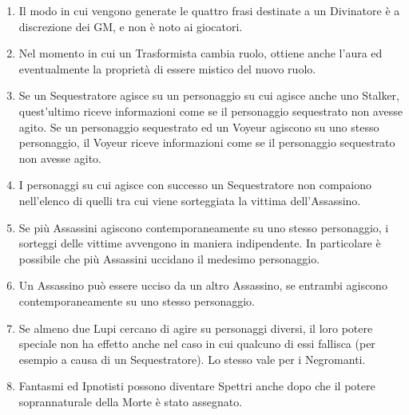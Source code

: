 \documentclass[a4paper,10pt]{article}
\begin{document}
\begin{enumerate}
 \item Il modo in cui vengono generate le quattro frasi destinate a un Divinatore è a discrezione dei GM, e non è noto ai giocatori.
 
 \item Nel momento in cui un Trasformista cambia ruolo, ottiene anche l'aura ed eventualmente la proprietà di essere mistico del nuovo ruolo.
 
 \item Se un Sequestratore agisce su un personaggio su cui agisce anche uno Stalker, quest'ultimo riceve informazioni come se il personaggio sequestrato non avesse agito. Se un personaggio sequestrato ed un Voyeur agiscono su uno stesso personaggio, il Voyeur riceve informazioni come se il personaggio sequestrato non avesse agito.
 
 \item I personaggi su cui agisce con successo un Sequestratore non compaiono nell'elenco di quelli tra cui viene sorteggiata la vittima dell'Assassino.
 
 \item Se più Assassini agiscono contemporaneamente su uno stesso personaggio, i sorteggi delle vittime avvengono in maniera indipendente.
 In particolare è possibile che più Assassini uccidano il medesimo personaggio.
 
 \item Un Assassino può essere ucciso da un altro Assassino, se entrambi agiscono contemporaneamente su uno stesso personaggio.
 
 \item Se almeno due Lupi cercano di agire su personaggi diversi, il loro potere speciale non ha effetto anche nel caso in cui qualcuno di essi fallisca (per esempio a causa di un Sequestratore). Lo stesso vale per i Negromanti.
 
 \item Fantasmi ed Ipnotisti possono diventare Spettri anche dopo che il potere soprannaturale della Morte è stato assegnato.
 

\end{enumerate}
\end{document}
